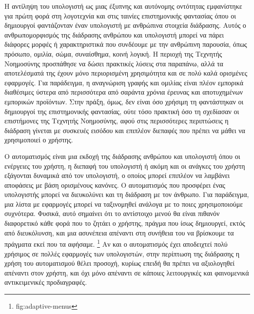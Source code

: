 \documentclass[
]{article}
\begin{document}
Η αντίληψη του υπολογιστή ως μιας έξυπνης και αυτόνομης οντότητας
εμφανίστηκε για πρώτη φορά στη λογοτεχνία και στις ταινίες επιστημονικής
φαντασίας όπου οι δημιουργοί φαντάζονταν έναν υπολογιστή με ανθρώπινα
στοιχεία διάδρασης. Αυτός ο ανθρωπομορφισμός της διάδρασης ανθρώπου και
υπολογιστή μπορεί να πάρει διάφορες μορφές ή χαρακτηριστικά που
συνδέουμε με την ανθρώπινη παρουσία, όπως πρόσωπο, ομιλία, σώμα,
συναίσθημα, κοινή λογική. Η περιοχή της Τεχνητής Νοημοσύνης προσπάθησε
να δώσει πρακτικές λύσεις στα παραπάνω, αλλά τα αποτελέσματά της έχουν
μόνο περιορισμένη χρησιμότητα και σε πολύ καλά ορισμένες εφαρμογές. Για
παράδειγμα, η αναγνώριση γραφής και ομιλίας είναι πλέον εμπορικά
διαθέσιμες ύστερα από περισσότερα από σαράντα χρόνια έρευνας και
αποτυχημένων εμπορικών προϊόντων. Στην πράξη, όμως, δεν είναι όσο
χρήσιμη τη φαντάστηκαν οι δημιουργοί της επιστημονικής φαντασίας, ούτε
τόσο πρακτική όσο τη σχεδίασαν οι επιστήμονες της Τεχνητής Νοημοσύνης,
αφού στις περισσότερες περιπτώσεις η διάδραση γίνεται με συσκευές
εισόδου και επιπλέον διεπαφές που πρέπει να μάθει να χρησιμοποιεί ο
χρήστης.

Ο αυτοματισμός είναι μια εκδοχή της διάδρασης ανθρώπου και υπολογιστή
όπου οι ενέργειες του χρήστη, η διεπαφή του υπολογιστή ή ακόμη και οι
ανάγκες του χρήστη εξάγονται δυναμικά από τον υπολογιστή, ο οποίος
μπορεί επιπλέον να λαμβάνει αποφάσεις με βάση ορισμένους κανόνες. Ο
αυτοματισμός που προσφέρει ένας υπολογιστής μπορεί να διευκολύνει και τη
διάδραση με τον άνθρωπο. Για παράδειγμα, μια λίστα με εφαρμογές μπορεί
να ταξινομηθεί ανάλογα με το ποιες χρησιμοποιούμε συχνότερα. Φυσικά,
αυτό σημαίνει ότι το αντίστοιχο μενού θα είναι πιθανόν διαφορετικό κάθε
φορά που το ζητάει ο χρήστης, πράγμα που ίσως δημιουργεί, εκτός από
διευκόλυνση, και μια ασυνέπεια απέναντι στη συνήθεια του να βρίσκουμε τα
πράγματα εκεί που τα αφήσαμε. \footnote{fig:adaptive-menus} Αν και ο
αυτοματισμός έχει αποδειχτεί πολύ χρήσιμος σε πολλές εφαρμογές των
υπολογιστών, στην περίπτωση της διάδρασης η χρήση του αυτοματισμού θέλει
προσοχή, κυρίως επειδή θα πρέπει να αξιολογηθεί απέναντι στον χρήστη,
και όχι μόνο απέναντι σε κάποιες λειτουργικές και φαινομενικά
αντικειμενικές προδιαγραφές.
\end{document}
